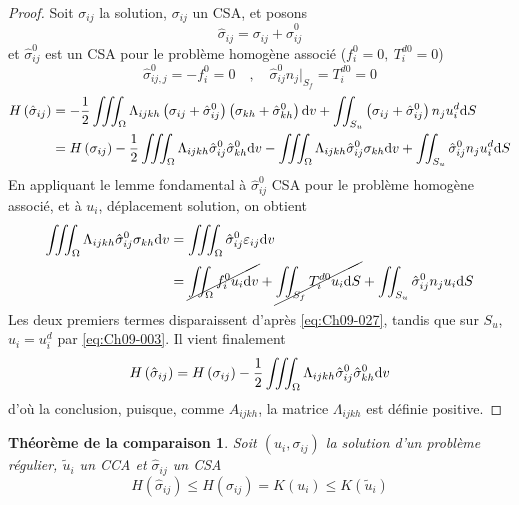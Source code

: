 \begin{proof}
    Soit $\sigma_{ij}$ la solution, $\sigma_{ij}$ un CSA, et posons
    \begin{equation}
        \hat{\sigma}_{ij} = \sigma_{ij} + \hat{\sigma}_{ij}^0
        \label{eq:Ch09-026}
    \end{equation}
    et $\hat{\sigma}_{ij}^0$ est un CSA pour le problème homogène associé ($f_i^0 = 0,\ T_i^{d0} = 0$)
    \begin{equation}
        \hat{\sigma}_{ij,j}^0 = -f_i^0 = 0 \quad,\quad \hat{\sigma}_{ij}^0 n_j |_{S_f} = T_i^{d0} = 0
        \label{eq:Ch09-027}
    \end{equation}
    \begin{align*}
        H\left( \hat{\sigma}_{ij} \right) &= - \frac{1}{2} \iiint_{\Omega} \Lambda_{ijkh} \left( \sigma_{ij} + \hat{\sigma}_{ij}^0 \right) \left( \sigma_{kh} + \hat{\sigma}_{kh}^0 \right) \mathrm{d} v + \iint_{S_u} \left( \sigma_{ij} + \hat{\sigma}_{ij}^0 \right) n_j u_i^d \mathrm{d} S \\
        &= H\left( \sigma_{ij} \right) - \frac{1}{2} \iiint_{\Omega} \Lambda_{ijkh} \hat{\sigma}_{ij}^0 \hat{\sigma}_{kh}^0 \mathrm{d} v - \iiint_{\Omega} \Lambda_{ijkh} \hat{\sigma}_{ij}^0 \sigma_{kh} \mathrm{d} v + \iint_{S_u} \hat{\sigma}^0_{ij} n_j u_i^d \mathrm{d} S
    \end{align*}
    En appliquant le lemme fondamental à $\hat{\sigma}_{ij}^0$ CSA pour le problème homogène associé, et à $u_i$, déplacement solution, on obtient
    \begin{align*}
        \iiint_{\Omega} \Lambda_{ijkh} \hat{\sigma}_{ij}^0 \sigma_{kh} \mathrm{d} v &= \iiint_{\Omega} \hat{\sigma}_{ij}^0 \varepsilon_{ij} \mathrm{d} v \\
        &= \cancel{\iint_{\Omega} f_i^0 u_i \mathrm{d} v} + \cancel{\iint_{S_f} T_i^{d0} u_i \mathrm{d} S} + \iint_{S_u} \hat{\sigma}_{ij}^0 n_j u_i \mathrm{d} S
    \end{align*}
    Les deux premiers termes disparaissent d'après \eqref{eq:Ch09-027}, tandis que sur $S_u$, $u_i=u_i^d$ par \eqref{eq:Ch09-003}.
    Il vient finalement 
    \begin{equation}
        H \left( \hat{\sigma}_{ij} \right) = H \left( \sigma_{ij} \right) - \frac{1}{2} \iiint_{\Omega} \Lambda_{ijkh} \hat{\sigma}_{ij}^0 \hat{\sigma}_{kh}^0 \mathrm{d} v
        \label{eq:Ch09-028}
    \end{equation}
    d'où la conclusion, puisque, comme $A_{ijkh}$, la matrice $\Lambda_{ijkh}$ est définie positive.
\end{proof}
\newtheorem*{ThComp}{Théorème de la comparaison}
\begin{ThComp}
    Soit $\left( u_i, \sigma_{ij} \right)$ la solution d'un problème régulier, $\tilde{u}_i$ un CCA et $\hat{\sigma}_{ij}$ un CSA
    \begin{equation}
        H \left( \hat{\sigma}_{ij} \right) \leq H \left( \sigma_{ij} \right) = K \left( u_i \right) \leq K \left( \tilde{u}_i \right)
        \label{eq:Ch09-029}
    \end{equation}
\end{ThComp}


